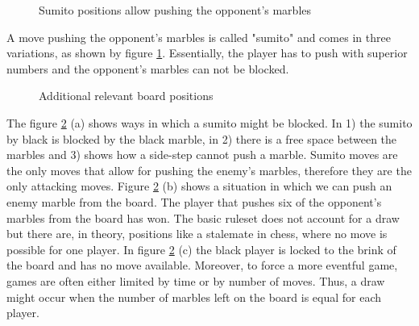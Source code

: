 \begin{figure}[!h]
    \centering
    \hfill
    \hfill
    \caption{Sumito positions allow pushing the opponent's marbles \cite{abalone_sa_abalone_nodate}}
    \label{sumito}
\end{figure}

A move pushing the opponent's marbles is called "sumito" and comes in three variations, as shown by figure \ref{sumito}. Essentially, the player has to push with superior numbers and the opponent's marbles can not be blocked.

\begin{figure}[!h]
    \centering
    \hfill
    \hfill
    \caption{Additional relevant board positions \cite{abalone_sa_abalone_nodate}}
    \label{additional_relevant_positions}
\end{figure}

The figure \ref{additional_relevant_positions} (a) shows ways in which a sumito might be blocked. In 1) the sumito by black is blocked by the black marble, in 2) there is a free space between the marbles and 3) shows how a side-step cannot push a marble. Sumito moves are the only moves that allow for pushing the enemy's marbles, therefore they are the only attacking moves. Figure \ref{additional_relevant_positions} (b) shows a situation in which we can push an enemy marble from the board. The player that pushes six of the opponent's marbles from the board has won. The basic ruleset does not account for a draw but there are, in theory, positions like a stalemate in chess, where no move is possible for one player. In figure \ref{additional_relevant_positions} (c) the black player is locked to the brink of the board and has no move available. Moreover, to force a more eventful game, games are often either limited by time or by number of moves. Thus, a draw might occur when the number of marbles left on the board is equal for each player.

